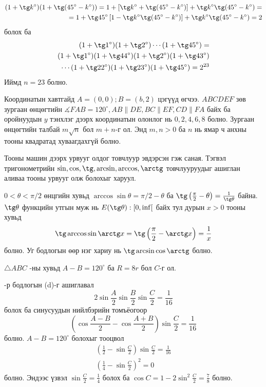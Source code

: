 \documentclass[10pt,a4paper,oneside]{book}
\begin{document}
\ASolution
\begin{align*}
(1+\tg k^\circ)(1+\tg (45^\circ-k^\circ)) = 1+\left[\tg k^\circ + \tg (45^\circ - k^\circ)\right] + \tg k^\circ \tg (45^\circ - k^\circ) = \\
= 1+\tg 45^\circ\left[1- \tg k^\circ \tg(45^\circ - k^\circ)\right] + \tg k^\circ \tg (45^\circ - k^\circ) = 2
\end{align*}
болох ба
\begin{align*}
(1+\tg 1^\circ)(1+\tg 2^\circ)\cdots(1+\tg 45^\circ) =\\
(1+\tg 1^\circ)(1+\tg 44^\circ)(1+\tg 2^\circ)(1+\tg 43^\circ)\\
\cdots(1+\tg 22^\circ)(1+\tg 23^\circ)(1+\tg 45^\circ) = 2^{23}
\end{align*}
Иймд $n=23$ болно.

\Problem
[AIME 2003] Координатын хавтгайд $A=(0, 0); B=(b, 2)$ цэгүүд өгчээ. $ABCDEF$ зөв зургаан өнцөгтийн $\measuredangle FAB = 120^\circ, AB \| DE, BC\|EF, CD\|FA$ байх ба оройнуудын $y$ тэнхлэг дээрх координатын олонлог нь ${0, 2, 4, 6, 8}$ болно. Зургаан өнцөгтийн талбай $m\sqrt{n}$ бол $m+n$-г ол. Энд $m, n > 0$ ба $n$ нь ямар ч анхны тооны квадратад хуваагдахгүй болно.

\Note

\Problem
Тооны машин дээрх урвууг олдог товчлуур эвдэрсэн гэж саная. Тэгвэл тригонометрийн $\sin, \cos, \tg, \arcsin, \arccos, \arctg$ товчлууруудыг ашиглан аливаа тооны урвууг олж болохыг харуул.

\TheSolution
$0<\theta < \pi/2$ өнцгийн хувьд $\arccos\sin \theta = \pi/2 - \theta$ ба $\tg\left(\frac{\pi}{2} - \theta\right) = \frac{1}{\tg\theta}$ байна. $\tg\theta$ функцийн утгын муж нь $E(\tg\theta): [0, \inf[$ байх тул дурын $x > 0$ тооны хувьд
\begin{equation*}
\tg\arccos\sin\arctg x = \tg \left(\frac{\pi}{2} - \arctg x \right) = \frac{1}{x}
\end{equation*}
болно. Уг бодлогын өөр нэг хариу нь $\tg\arcsin\cos\arctg$ болно.

\Problem
$\triangle ABC$ -ны хувьд $A-B=120^\circ$ ба $R=8r$ бол $C$-г ол.

-р бодлогын (d)-г ашиглавал
\begin{equation*}
2\sin\frac{A}{2}\sin\frac{B}{2}\sin\frac{C}{2} = \frac{1}{16}
\end{equation*}
болох ба синусуудын нийлбэрийн томъёогоор
\begin{equation*}
\left(\cos\frac{A-B}{2} - \cos\frac{A+B}{2}\right)\sin\frac{C}{2} = \frac{1}{16}
\end{equation*}
болно. $A-B=120^\circ$ болохыг тооцвол
\begin{align*}
\left(\frac{1}{2} - \sin\frac{C}{2}\right)\sin\frac{C}{2} = \frac{1}{16} \\
\left(\frac{1}{4} - \sin\frac{C}{2}\right)^2 = 0
\end{align*}
болно. Эндээс үзвэл $\sin\frac{C}{2} = \frac{1}{4}$ болох ба $\cos C = 1-2\sin^2 \frac{C}{2} = \frac{7}{8}$ болно.
\end{document}
